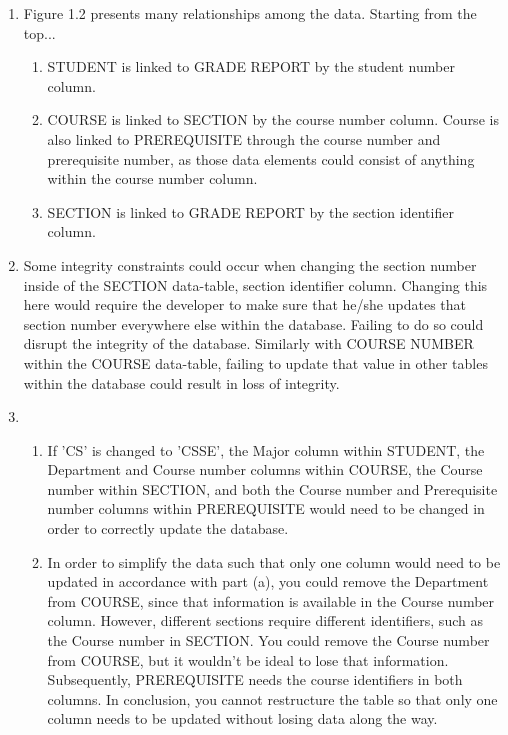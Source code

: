 \documentclass[12pt]{article}
\begin{document}
\begin{enumerate}
	\item Figure 1.2 presents many relationships among the data. Starting from the top...
	\begin{enumerate}
		\item STUDENT is linked to GRADE REPORT by the student number column.
		\item COURSE is linked to SECTION by the course number column. Course is also linked to PREREQUISITE through the course number and prerequisite number, as those data elements could consist of anything within the course number column.
		\item SECTION is linked to GRADE REPORT by the section identifier column.	
	\end{enumerate}
	
	\item Some integrity constraints could occur when changing the section number inside of the SECTION data-table, section identifier column. Changing this here would require the developer to make sure that he/she updates that section number everywhere else within the database. Failing to do so could disrupt the integrity of the database. Similarly with COURSE NUMBER within the COURSE data-table, failing to update that value in other tables within the database could result in loss of integrity.
	
	\item 
	\begin{enumerate}
		\item If 'CS' is changed to 'CSSE', the Major column within STUDENT, the Department and  Course number columns within COURSE, the Course number within SECTION, and both the Course number and  Prerequisite number columns within PREREQUISITE would need to be changed in order to correctly update the database.
		\item In order to simplify the data such that only one column would need to be updated in accordance with part (a), you could remove the Department from COURSE, since that information is available in the Course number column. However, different sections require different identifiers, such as the Course number in SECTION. You could remove the Course number from COURSE, but it wouldn't be ideal to lose that information. Subsequently, PREREQUISITE needs the course identifiers in both columns. In conclusion, you cannot restructure the table so that only one column needs to be updated without losing data along the way.
	\end{enumerate}
	
\end{enumerate}
\end{document}
